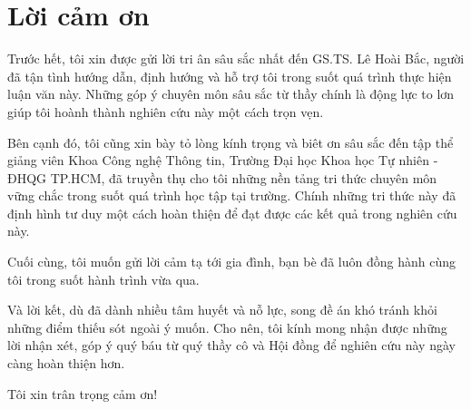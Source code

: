 \chapter*{Lời cảm ơn}
\label{thanks}

Trước hết, tôi xin được gửi lời tri ân sâu sắc nhất đến GS.TS. Lê Hoài Bắc, người đã tận tình hướng dẫn, định hướng và hỗ trợ tôi trong suốt quá trình thực hiện luận văn này. Những góp ý chuyên môn sâu sắc từ thầy chính là động lực to lơn giúp tôi hoành thành nghiên cứu này một cách trọn vẹn.

Bên cạnh đó, tôi cũng xin bày tỏ lòng kính trọng và biêt ơn sâu sắc đến tập thể giảng viên Khoa Công nghệ Thông tin, Trường Đại học Khoa học Tự nhiên - ĐHQG TP.HCM, đã truyền thụ cho tôi những nền tảng tri thức chuyên môn vững chắc trong suốt quá trình học tập tại trường. Chính những tri thức này đã định hình tư duy một cách hoàn thiện để đạt được các kết quả trong nghiên cứu này.

Cuối cùng, tôi muốn gửi lời cảm tạ tới gia đình, bạn bè đã luôn đồng hành cùng tôi trong suốt hành trình vừa qua.

Và lời kết, dù đã dành nhiều tâm huyết và nỗ lực, song đề án khó tránh khỏi những điểm thiếu sót ngoài ý muốn. Cho nên, tôi kính mong nhận được những lời nhận xét, góp ý quý báu từ quý thầy cô và Hội đồng để nghiên cứu này ngày càng hoàn thiện hơn.

Tôi xin trân trọng cảm ơn!
